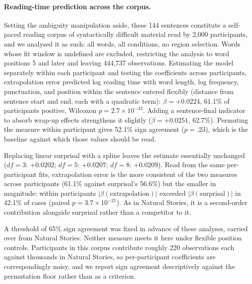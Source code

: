 \documentclass[12pt]{article}
\begin{document}
{\paragraph{Reading-time prediction across the corpus.} Setting the ambiguity manipulation aside, these 144 sentences constitute a self-paced reading corpus of syntactically difficult material read by 2,000 participants, and we analysed it as such: all words, all conditions, no region selection. Words whose fit window is undefined are excluded, restricting the analysis to word positions 5 and later and leaving 444,737 observations. Estimating the model separately within each participant and testing the coefficients across participants, extrapolation error predicted log reading time with word length, log frequency, punctuation, and position within the sentence entered flexibly (distance from sentence start and end, each with a quadratic term): $\beta = +0.0224$, 61.1\% of participants positive, Wilcoxon $p = 2.7 \times 10^{-32}$. Adding a sentence-final indicator to absorb wrap-up effects strengthens it slightly ($\beta = +0.0251$, 62.7\%). Permuting the measure within participant gives 52.1\% sign agreement ($p = .23$), which is the baseline against which those values should be read.

Replacing linear surprisal with a spline leaves the estimate essentially unchanged ($df = 3$: $+0.0202$; $df = 5$: $+0.0207$; $df = 8$: $+0.0209$). Read from the same per-participant fits, extrapolation error is the more consistent of the two measures across participants (61.1\% against surprisal's 56.6\%) but the smaller in magnitude: within participants $|\beta(\text{extrapolation})|$ exceeded $|\beta(\text{surprisal})|$ in 42.1\% of cases (paired $p = 3.7 \times 10^{-21}$). As in Natural Stories, it is a second-order contribution alongside surprisal rather than a competitor to it.

A threshold of 65\% sign agreement was fixed in advance of these analyses, carried over from Natural Stories. Neither measure meets it here under flexible position controls. Participants in this corpus contribute roughly 220 observations each against thousands in Natural Stories, so per-participant coefficients are correspondingly noisy, and we report sign agreement descriptively against the permutation floor rather than as a criterion.

}
\end{document}
